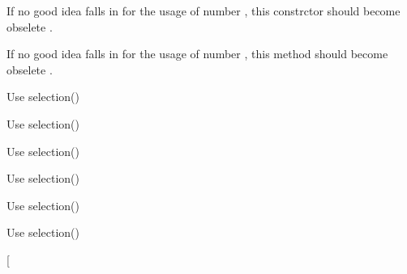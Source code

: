 
\begin{DoxyRefList}
\item[\label{deprecated__deprecated000015}%
\hypertarget{deprecated__deprecated000015}{}%
Member \hyperlink{classmdt_error_a377c175cc8e1aeae543cae2ecc5ca87b}{mdt\-Error\-:\-:mdt\-Error} (int number, const Q\-String \&text, level\-\_\-t level)]If no good idea falls in for the usage of number , this constrctor should become obselete .  
\item[\label{deprecated__deprecated000016}%
\hypertarget{deprecated__deprecated000016}{}%
Member \hyperlink{classmdt_error_ad233adb8efe4180b85f584c5afdd49fc}{mdt\-Error\-:\-:number} () const ]If no good idea falls in for the usage of number , this method should become obselete .  
\item[\label{deprecated__deprecated000003}%
\hypertarget{deprecated__deprecated000003}{}%
Member \hyperlink{classmdt_sql_selection_dialog_ae5582bd717078a137dd71d5a1b9cc9f9}{mdt\-Sql\-Selection\-Dialog\-:\-:add\-Selection\-Result\-Column} (const Q\-String \&field)]Use selection()  
\item[\label{deprecated__deprecated000007}%
\hypertarget{deprecated__deprecated000007}{}%
Member \hyperlink{classmdt_sql_selection_dialog_aab4943bc01e64f867791c15eea613e23}{mdt\-Sql\-Selection\-Dialog\-:\-:selected\-Data} (int row, const Q\-String \&field\-Name)]Use selection()  
\item[\label{deprecated__deprecated000004}%
\hypertarget{deprecated__deprecated000004}{}%
Member \hyperlink{classmdt_sql_selection_dialog_affdf9a9936509c8b6ca141b8ff415995}{mdt\-Sql\-Selection\-Dialog\-:\-:selected\-Data\-Record} ()]Use selection()  
\item[\label{deprecated__deprecated000005}%
\hypertarget{deprecated__deprecated000005}{}%
Member \hyperlink{classmdt_sql_selection_dialog_a23592c799f3b8945b3f5e72082dc265b}{mdt\-Sql\-Selection\-Dialog\-:\-:selection\-Result} ()]Use selection()  
\item[\label{deprecated__deprecated000006}%
\hypertarget{deprecated__deprecated000006}{}%
Member \hyperlink{classmdt_sql_selection_dialog_a85b7c1e3e156c141315d0873fa36d4b3}{mdt\-Sql\-Selection\-Dialog\-:\-:selection\-Results} ()]Use selection()  
\item[\label{deprecated__deprecated000002}%
\hypertarget{deprecated__deprecated000002}{}%
Member \hyperlink{classmdt_sql_selection_dialog_a5c5c36414bf3c432979f53ad27f985cb}{mdt\-Sql\-Selection\-Dialog\-:\-:set\-Selection\-Result\-Columns} (const Q\-String\-List \&fields)]Use selection()  
\item[\label{deprecated__deprecated000001}%

\end{DoxyRefList}

